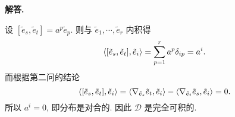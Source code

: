 \documentclass{ctexart}
\newenvironment{solution}{\par\noindent\textbf{解答. }}{\par}
\begin{document}
\begin{solution}
\begin{enumerate}
        设 $[\tilde{e}_s, \tilde{e}_t] = a^{p}\tilde{e}_{p}$. 则与 $\tilde{e}_1, \cdots, \tilde{e}_r$ 内积得
        \[
            \langle {[\tilde{e}_s, \tilde{e}_t]}, {\tilde{e}_i} \rangle = \sum_{p = 1}^{r}a^p\delta_{ip} = a^i.
        \]
        而根据第二问的结论
        \[
            \langle {[\tilde{e}_s, \tilde{e}_t]}, {\tilde{e}_i} \rangle = \langle {\nabla_{\tilde{e}_s}\tilde{e}_t}, {\tilde{e}_i} \rangle - \langle {\nabla_{\tilde{e}_t}\tilde{e}_s}, {\tilde{e}_i} \rangle = 0.
        \]
        所以 $a^i = 0$, 即分布是对合的. 因此 $\mathscr{D}$ 是完全可积的.
    \end{enumerate}
\end{solution}
\end{document}
